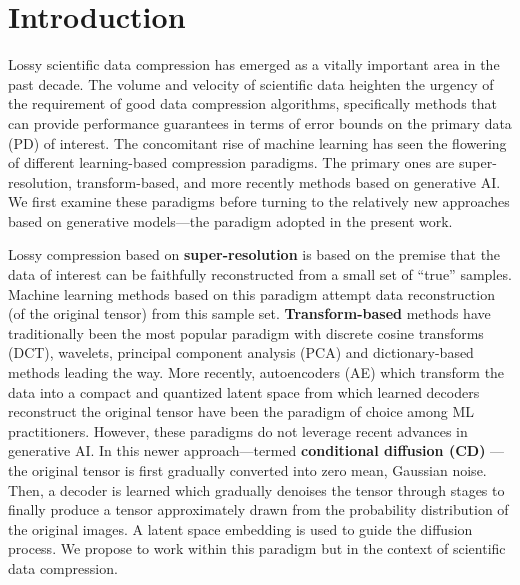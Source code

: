 \section{Introduction}

Lossy scientific data compression has emerged as a vitally important area in the past decade. The volume and velocity of scientific data heighten the urgency of the requirement of good data compression algorithms, specifically methods that can provide performance guarantees in terms of error bounds on the primary data (PD) of interest. The concomitant rise of machine learning has seen the flowering of different learning-based compression paradigms. The primary ones are super-resolution, transform-based, and more recently methods based on generative AI. We first examine these paradigms before turning to the relatively new approaches based on generative models---the paradigm adopted in the present work.

Lossy compression based on \textbf{super-resolution} \cite{Khani2021,Conde2022swin2sr} is based on the premise that the data of interest can be faithfully reconstructed from a small set of ``true'' samples. Machine learning methods based on this paradigm attempt data reconstruction (of the original tensor) from this sample set. \textbf{Transform-based} methods have traditionally been the most popular paradigm with discrete cosine transforms (DCT), wavelets, principal component analysis (PCA) and dictionary-based methods leading the way. More recently, autoencoders (AE) which transform the data into a compact and quantized latent space from which learned decoders reconstruct the original tensor have been the paradigm of choice among ML practitioners. However, these paradigms do not leverage recent advances in generative AI. In this newer approach---termed \textbf{conditional diffusion (CD)} \cite{Yang2023cd}---the original tensor is first gradually converted into zero mean, Gaussian noise. Then, a decoder is learned which gradually denoises the tensor through stages to finally produce a tensor approximately drawn from the probability distribution of the original images. A latent space embedding is used to guide the diffusion process. We propose to work within this paradigm but in the context of scientific data compression.


